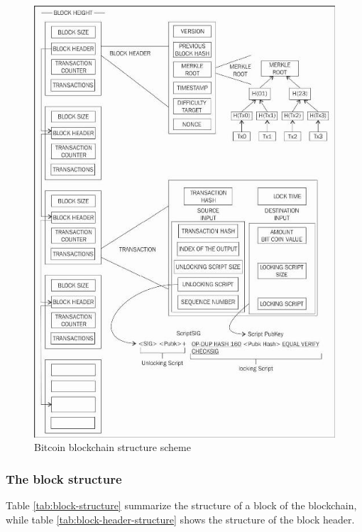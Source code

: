 \begin{figure}[!htb]
	\centering
	\includegraphics[width=0.9\linewidth]{img/bitcoin-blockchain-scheme.png}
	\caption{Bitcoin blockchain structure scheme}
	\label{fig:bitcoin-blockchain}
\end{figure}


\subsubsection{The block structure} Table \ref{tab:block-structure} summarize
the structure of a block of the blockchain, while table
\ref{tab:block-header-structure} shows the structure of the block header.

